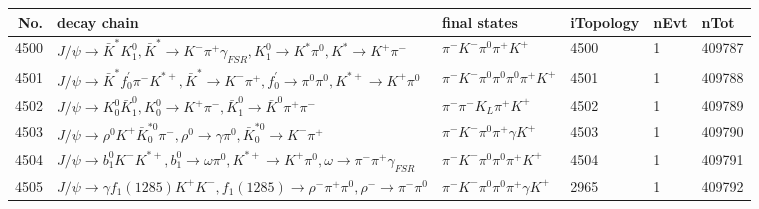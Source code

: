 \begin{table}[htbp] 
\begin{center}
\begin{small}
\begin{tabular}{rlllll}\hline\hline
 No. & decay chain & final states &  iTopology & nEvt & nTot \\\hline
4500&$J/\psi       \rightarrow \bar{K}^{*}   K_1^{0}        , \bar{K}^{*}    \rightarrow K^{-}          \pi^{+}        \gamma_{FSR} , K_1^{0}         \rightarrow K^{*}          \pi^{0}        , K^{*}           \rightarrow K^{+}          \pi^{-}        $&$\pi^{-}        K^{-}          \pi^{0}        \pi^{+}        K^{+}          $& 4500&    1&409787\\
4501&$J/\psi       \rightarrow \bar{K}^{*}   f^{'}_{0}     \pi^{-}        K^{*+}         , \bar{K}^{*}    \rightarrow K^{-}          \pi^{+}        , f^{'}_{0}      \rightarrow \pi^{0}        \pi^{0}        , K^{*+}          \rightarrow K^{+}          \pi^{0}        $&$\pi^{-}        K^{-}          \pi^{0}        \pi^{0}        \pi^{0}        \pi^{+}        K^{+}          $& 4501&    1&409788\\
4502&$J/\psi       \rightarrow K_0^{0}        \bar{K}_1^{0} , K_0^{0}         \rightarrow K^{+}          \pi^{-}        , \bar{K}_1^{0}  \rightarrow \bar{K}^{0}   \pi^{+}        \pi^{-}        $&$\pi^{-}        \pi^{-}        K_{L}          \pi^{+}        K^{+}          $& 4502&    1&409789\\
4503&$J/\psi       \rightarrow \rho^{0}      K^{+}          \bar{K}_0^{*0}\pi^{-}        , \rho^{0}       \rightarrow \gamma       \pi^{0}        , \bar{K}_0^{*0} \rightarrow K^{-}          \pi^{+}        $&$\pi^{-}        K^{-}          \pi^{0}        \pi^{+}        \gamma       K^{+}          $& 4503&    1&409790\\
4504&$J/\psi       \rightarrow b_{1}^{0}      K^{-}          K^{*+}         , b_{1}^{0}       \rightarrow \omega         \pi^{0}        , K^{*+}          \rightarrow K^{+}          \pi^{0}        , \omega          \rightarrow \pi^{-}        \pi^{+}        \gamma_{FSR} $&$\pi^{-}        K^{-}          \pi^{0}        \pi^{0}        \pi^{+}        K^{+}          $& 4504&    1&409791\\
4505&$J/\psi       \rightarrow \gamma       f_{1}(1285)    K^{+}          K^{-}          , f_{1}(1285)     \rightarrow \rho^{-}      \pi^{+}        \pi^{0}        , \rho^{-}       \rightarrow \pi^{-}        \pi^{0}        $&$\pi^{-}        K^{-}          \pi^{0}        \pi^{0}        \pi^{+}        \gamma       K^{+}          $& 2965&    1&409792\\

\end{tabular}
\end{small}
\end{center}
\end{table}
